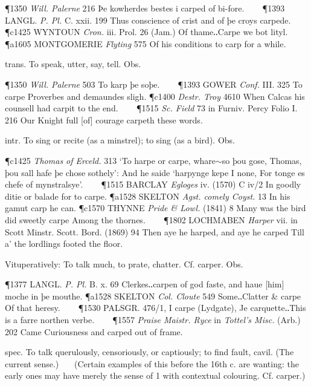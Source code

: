 \begin{description}[wide, labelwidth=!, labelindent=0pt]
\begin{myenumerate}
\P 1350 \textit{Will.  Palerne} 216 Þe kowherdes bestes i carped of bi-fore.    
\P 1393 LANGL.  \textit{P. Pl.} C. xxii. 199 Thus conscience of crist and of þe croys carpede.  
\P c1425 WYNTOUN  \textit{Cron.} iii. Prol. 26 (Jam.) Of thame‥Carpe we bot lityl.
\P a1605 MONTGOMERIE  \textit{Flyting} 575 Of his conditions to carp for a while.

 trans. To speak, utter, say, tell. Obs.

\P 1350 \textit{Will.  Palerne} 503 To karp þe soþe.    
\P 1393 GOWER  \textit{Conf.} III. 325 To carpe Proverbes and demaundes sligh.
\P c1400  \textit{Destr. Troy} 4610 When Calcas his counsell had carpit to the end.    
\P 1515 \textit{Sc. Field} 73 in Furniv. Percy Folio I. 216 Our Knight full [of] courage carpeth these words.

 intr. To sing or recite (as a minstrel); to sing (as a bird). Obs.

\P c1425 \textit{Thomas  of Erceld.} 313 ‘To harpe or carpe, whare$\sim$so þou gose, Thomas, þou sall hafe þe chose sothely’: And he saide ‘harpynge kepe I none, For tonge es chefe of mynstralsye’.    
\P 1515 BARCLAY  \textit{Egloges} iv. (1570) C iv/2 In goodly ditie or balade for to carpe.
\P a1528 SKELTON  \textit{Agst. comely Coyst.} 13 In his gamut carp he can.
\P c1570 THYNNE  \textit{Pride \& Lowl.} (1841) 8 Many was the bird did sweetly carpe Among the thornes.    
\P 1802 LOCHMABEN  \textit{Harper} vii. in Scott Minstr. Scott. Bord. (1869) 94 Then aye he harped, and aye he carped Till a' the lordlings footed the floor.

 Vituperatively: To talk much, to prate, chatter. Cf. carper. Obs.

\P 1377 LANGL.  \textit{P. Pl.} B. x. 69 Clerkes‥carpen of god faste, and haue [him] moche in þe mouthe.
\P a1528 SKELTON  \textit{Col. Cloute} 549 Some‥Clatter \& carpe Of that heresy.    
\P 1530 PALSGR. 476/1, I carpe (Lydgate), Je carquette‥This is a farre northen verbe.    
\P 1557 \textit{Praise  Maistr. Ryce} in \textit{Tottel's Misc.} (Arb.) 202 Came Curiousness and carped out of frame.

 spec. To talk querulously, censoriously, or captiously; to find fault, cavil. (The current sense.)
   (Certain examples of this before the 16th c. are wanting: the early ones may have merely the sense of 1 with contextual colouring. Cf. carper.)


\end{myenumerate}
\end{description}

